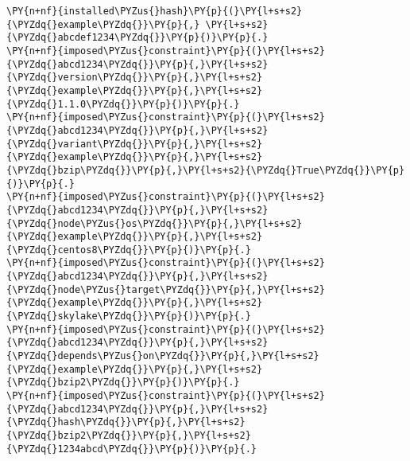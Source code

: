 \begin{Verbatim}[commandchars=\\\{\},fontsize=\footnotesize]
\PY{n+nf}{installed\PYZus{}hash}\PY{p}{(}\PY{l+s+s2}{\PYZdq{}example\PYZdq{}}\PY{p}{,} \PY{l+s+s2}{\PYZdq{}abcdef1234\PYZdq{}}\PY{p}{)}\PY{p}{.}
\PY{n+nf}{imposed\PYZus{}constraint}\PY{p}{(}\PY{l+s+s2}{\PYZdq{}abcd1234\PYZdq{}}\PY{p}{,}\PY{l+s+s2}{\PYZdq{}version\PYZdq{}}\PY{p}{,}\PY{l+s+s2}{\PYZdq{}example\PYZdq{}}\PY{p}{,}\PY{l+s+s2}{\PYZdq{}1.1.0\PYZdq{}}\PY{p}{)}\PY{p}{.}
\PY{n+nf}{imposed\PYZus{}constraint}\PY{p}{(}\PY{l+s+s2}{\PYZdq{}abcd1234\PYZdq{}}\PY{p}{,}\PY{l+s+s2}{\PYZdq{}variant\PYZdq{}}\PY{p}{,}\PY{l+s+s2}{\PYZdq{}example\PYZdq{}}\PY{p}{,}\PY{l+s+s2}{\PYZdq{}bzip\PYZdq{}}\PY{p}{,}\PY{l+s+s2}{\PYZdq{}True\PYZdq{}}\PY{p}{)}\PY{p}{.}
\PY{n+nf}{imposed\PYZus{}constraint}\PY{p}{(}\PY{l+s+s2}{\PYZdq{}abcd1234\PYZdq{}}\PY{p}{,}\PY{l+s+s2}{\PYZdq{}node\PYZus{}os\PYZdq{}}\PY{p}{,}\PY{l+s+s2}{\PYZdq{}example\PYZdq{}}\PY{p}{,}\PY{l+s+s2}{\PYZdq{}centos8\PYZdq{}}\PY{p}{)}\PY{p}{.}
\PY{n+nf}{imposed\PYZus{}constraint}\PY{p}{(}\PY{l+s+s2}{\PYZdq{}abcd1234\PYZdq{}}\PY{p}{,}\PY{l+s+s2}{\PYZdq{}node\PYZus{}target\PYZdq{}}\PY{p}{,}\PY{l+s+s2}{\PYZdq{}example\PYZdq{}}\PY{p}{,}\PY{l+s+s2}{\PYZdq{}skylake\PYZdq{}}\PY{p}{)}\PY{p}{.}
\PY{n+nf}{imposed\PYZus{}constraint}\PY{p}{(}\PY{l+s+s2}{\PYZdq{}abcd1234\PYZdq{}}\PY{p}{,}\PY{l+s+s2}{\PYZdq{}depends\PYZus{}on\PYZdq{}}\PY{p}{,}\PY{l+s+s2}{\PYZdq{}example\PYZdq{}}\PY{p}{,}\PY{l+s+s2}{\PYZdq{}bzip2\PYZdq{}}\PY{p}{)}\PY{p}{.}
\PY{n+nf}{imposed\PYZus{}constraint}\PY{p}{(}\PY{l+s+s2}{\PYZdq{}abcd1234\PYZdq{}}\PY{p}{,}\PY{l+s+s2}{\PYZdq{}hash\PYZdq{}}\PY{p}{,}\PY{l+s+s2}{\PYZdq{}bzip2\PYZdq{}}\PY{p}{,}\PY{l+s+s2}{\PYZdq{}1234abcd\PYZdq{}}\PY{p}{)}\PY{p}{.}
\end{Verbatim}
